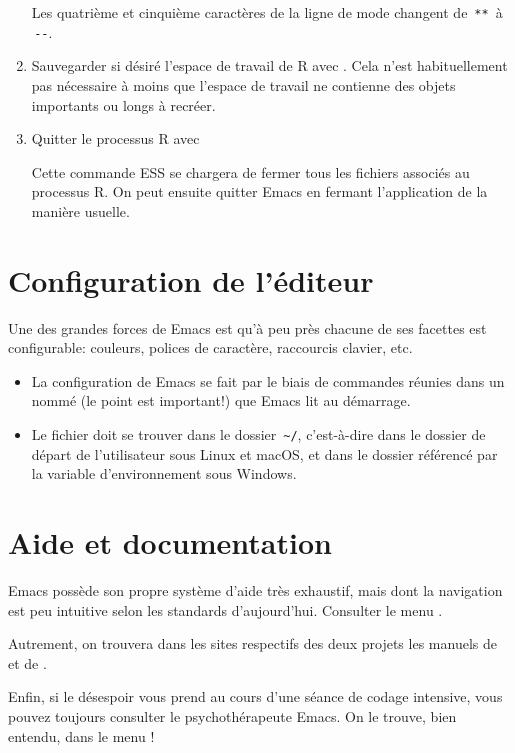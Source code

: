 \begin{enumerate}
  Les quatrième et cinquième caractères de la ligne de mode changent
  de \,\verb|**|\, à \,\verb|--|.
\item Sauvegarder si désiré l'espace de travail de R avec
  . Cela n'est
  habituellement pas nécessaire à moins que l'espace de travail ne
  contienne des objets importants ou longs à recréer.
\item Quitter le processus R avec
  \begin{quote}
  \end{quote}
  Cette commande ESS se chargera de fermer tous les fichiers associés
  au processus R. On peut ensuite quitter Emacs en fermant
  l'application de la manière usuelle.
\end{enumerate}



\section{Configuration de l'éditeur}
\label{sec:emacs+ess:configuration}

Une des grandes forces de Emacs est qu'à peu près chacune de ses
facettes est configurable: couleurs, polices de caractère, raccourcis
clavier, etc.

\begin{itemize}
\item La configuration de Emacs se fait par le biais de commandes
  réunies dans un %
  nommé  (le point est important!) que Emacs lit au
  démarrage.
\item Le fichier  doit se trouver dans le dossier
  \,\verb=~/=, c'est-à-dire dans le dossier de départ de l'utilisateur
  sous Linux et macOS, et dans le dossier référencé par la variable
  d'environnement  sous Windows.
\end{itemize}


\section{Aide et documentation}
\label{sec:emacs+ess:aide}

Emacs possède son propre système d'aide très exhaustif, mais dont la
navigation est peu intuitive selon les standards d'aujourd'hui.
Consulter le menu .

Autrement, on trouvera dans les sites respectifs des deux projets les
manuels de  et de
.

Enfin, si le désespoir vous prend au cours d'une séance de codage
intensive, vous pouvez toujours consulter le psychothérapeute Emacs.
On le trouve, bien entendu, dans le menu !



